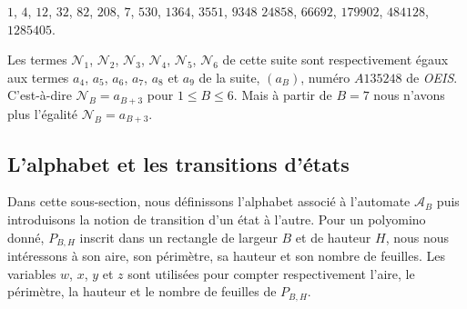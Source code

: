$1$, $4$, $12$, $32$, $82$, $208$, $7$, $530$, $1364$, $3551$, $9348$
 $24858$, $66692$, $179902$, $484128$, $1285405$.

Les termes $\mathcal{N}_{1}$, $\mathcal{N}_{2}$, $\mathcal{N}_{3}$, $\mathcal{N}_{4}$, $\mathcal{N}_{5}$, $\mathcal{N}_{6}$  de cette suite sont respectivement égaux aux termes $a_{4}$, $a_{5}$, $a_{6}$, $a_{7}$, $a_{8}$ et $a_{9}$ de la suite, $(a_{B})$, numéro $A135248$ de \emph{OEIS}. C'est-à-dire $\mathcal{N}_{B}=a_{B+3}$ pour $1\leq B\leq 6$. Mais à partir de $B=7$ nous n'avons plus l'égalité $\mathcal{N}_{B}=a_{B+3}$. 
\begin{spacing}{0.30}
\subsection{L'alphabet et les transitions d'états}
\end{spacing}
Dans cette sous-section, nous définissons l'alphabet associé à l'automate $\mathcal{A}_{B}$ puis  introduisons la notion de transition d'un état à l'autre. Pour un polyomino donné, $P_{B,H}$ inscrit dans un rectangle de largeur $B$ et de hauteur $H$, nous nous intéressons à son aire, son périmètre, sa hauteur et son nombre de feuilles. Les variables $w$, $x$, $y$ et $z$ sont utilisées pour compter respectivement l'aire, le périmètre, la hauteur et le nombre de feuilles de $P_{B,H}$.

